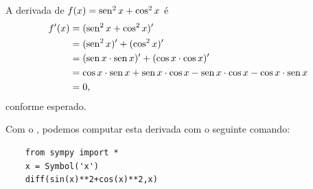 \begin{ex}
  A derivada de $f(x) = \operatorname{sen}^2 x + \cos^2 x$ é
  \begin{align}
    f'(x) &= (\operatorname{sen}^2x + \cos^2 x)' \\
          &= (\operatorname{sen}^2 x)' + (\cos^2 x)' \\
          &= (\operatorname{sen} x\cdot \operatorname{sen} x)' + (\cos x\cdot \cos x)' \\
          &= \cos x\cdot \operatorname{sen} x + \operatorname{sen} x\cdot\cos x -\operatorname{sen} x\cdot \cos x - \cos x\cdot\operatorname{sen} x\\
          &= 0,
  \end{align}
  conforme esperado.

  \ifispython
  Com o \sympy, podemos computar esta derivada com o seguinte comando:
\begin{lstlisting}
    from sympy import *
    x = Symbol('x')
    diff(sin(x)**2+cos(x)**2,x)
  \end{lstlisting}
  \fi
\end{ex}

